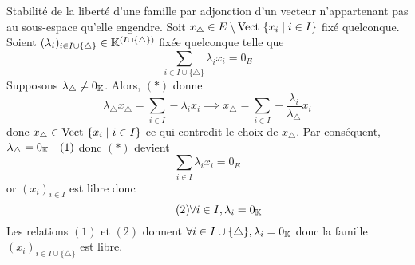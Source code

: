 \documentclass{article}
\begin{document}
\begin{question_kholle}{Stabilité de la liberté d’une famille par adjonction d’un vecteur n’appartenant pas au sous-espace qu’elle engendre.}
	Soit $x_{\triangle}\in E\setminus \text{Vect } \{x_{i} \mid i\in I\}$ fixé quelconque. Soient $(\lambda_{i})_{i\in I\cup\{\triangle\}}\in\mathbb K^{(I\cup \{\triangle\})}$ fixée quelconque telle que
	\begin{equation}\tag{$*$}
		\sum_{i\in I\cup\{\triangle\}}\lambda_{i} x_{i} = 0_{E}
	\end{equation}
	Supposons $\lambda_{\triangle}\neq 0_{\mathbb K}$. Alors, $(*)$ donne
	\[
		\lambda_{\triangle}x_{\triangle} = \sum_{i\in I}-\lambda_{i}x_{i} \implies x_{\triangle}=\sum_{i\in I}-\frac{\lambda_{i}}{\lambda_{\triangle}}x_{i}
	\]
	donc $x_{\triangle}\in\text{Vect }\{x_{i} \mid i\in I\}$ ce qui contredit le choix de $x_{\triangle}$. Par conséquent, $\lambda_{\triangle}=0_{\mathbb K}\quad (1)$ donc $(*)$ devient
	\[
		\sum_{i\in I}\lambda_{i} x_{i} = 0_{E}
	\]
	or $(x_{i})_{i\in I}$ est libre donc
	\begin{equation}\tag{$2$}
		\forall i\in I, \lambda_{i} = 0_{\mathbb K}
	\end{equation}
	Les relations $(1)$ et $(2)$ donnent $\forall i\in I\cup \{\triangle\}, \lambda_{i} = 0_{\mathbb K}$ donc la famille $(x_{i})_{i\in I\cup \{\triangle\}}$ est libre.
\end{question_kholle}
\end{document}
